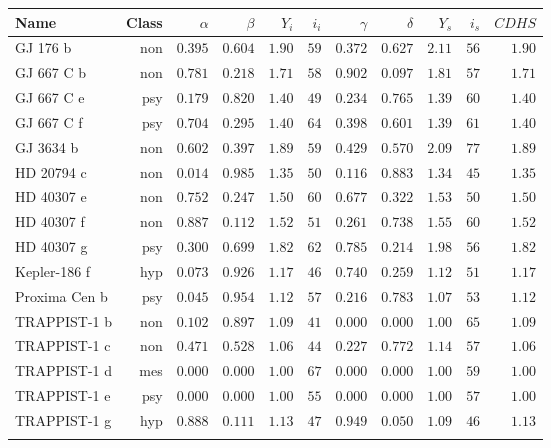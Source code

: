 \begin{tabular}{l r r r r r r r r r r}
  \toprule
  Name & Class & $\alpha$ & $\beta$ & $Y_i$ & $i_i$ & $\gamma$ & $\delta$ & $Y_s$ & $i_s$ & $\mathit{CDHS}$\\
  \midrule
  GJ 176 b & non & $0.395$ & $0.604$ & $1.90$ & $59$ & $0.372$ & $0.627$ & $2.11$ & $56$ & $1.90$\\
  GJ 667 C b & non & $0.781$ & $0.218$ & $1.71$ & $58$ & $0.902$ & $0.097$ & $1.81$ & $57$ & $1.71$\\
  GJ 667 C e & psy & $0.179$ & $0.820$ & $1.40$ & $49$ & $0.234$ & $0.765$ & $1.39$ & $60$ & $1.40$\\
  GJ 667 C f & psy & $0.704$ & $0.295$ & $1.40$ & $64$ & $0.398$ & $0.601$ & $1.39$ & $61$ & $1.40$\\
  GJ 3634 b & non & $0.602$ & $0.397$ & $1.89$ & $59$ & $0.429$ & $0.570$ & $2.09$ & $77$ & $1.89$\\
  HD 20794 c & non & $0.014$ & $0.985$ & $1.35$ & $50$ & $0.116$ & $0.883$ & $1.34$ & $45$ & $1.35$\\
  HD 40307 e & non & $0.752$ & $0.247$ & $1.50$ & $60$ & $0.677$ & $0.322$ & $1.53$ & $50$ & $1.50$\\
  HD 40307 f & non & $0.887$ & $0.112$ & $1.52$ & $51$ & $0.261$ & $0.738$ & $1.55$ & $60$ & $1.52$\\
  HD 40307 g & psy & $0.300$ & $0.699$ & $1.82$ & $62$ & $0.785$ & $0.214$ & $1.98$ & $56$ & $1.82$\\
  Kepler-186 f & hyp & $0.073$ & $0.926$ & $1.17$ & $46$ & $0.740$ & $0.259$ & $1.12$ & $51$ & $1.17$\\
  Proxima Cen b & psy & $0.045$ & $0.954$ & $1.12$ & $57$ & $0.216$ & $0.783$ & $1.07$ & $53$ & $1.12$\\
  TRAPPIST-1 b & non & $0.102$ & $0.897$ & $1.09$ & $41$ & $0.000$ & $0.000$ & $1.00$ & $65$ & $1.09$\\
  TRAPPIST-1 c & non & $0.471$ & $0.528$ & $1.06$ & $44$ & $0.227$ & $0.772$ & $1.14$ & $57$ & $1.06$\\
  TRAPPIST-1 d & mes & $0.000$ & $0.000$ & $1.00$ & $67$ & $0.000$ & $0.000$ & $1.00$ & $59$ & $1.00$\\
  TRAPPIST-1 e & psy & $0.000$ & $0.000$ & $1.00$ & $55$ & $0.000$ & $0.000$ & $1.00$ & $57$ & $1.00$\\
  TRAPPIST-1 g & hyp & $0.888$ & $0.111$ & $1.13$ & $47$ & $0.949$ & $0.050$ & $1.09$ & $46$ & $1.13$\\
  \bottomrule\\
\end{tabular}
